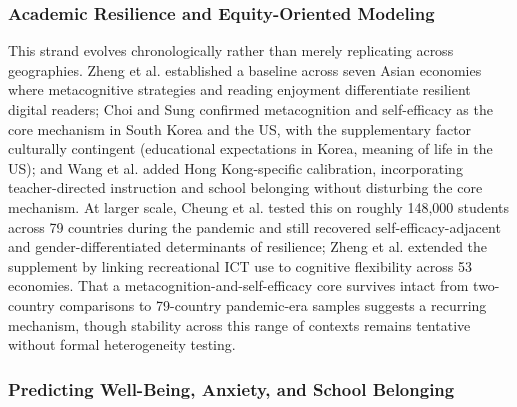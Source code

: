 \documentclass{ieeeaccess}
\begin{document}
\subsubsection{Academic Resilience and Equity-Oriented Modeling}\label{subsubsec4.3.1}

This strand evolves chronologically rather than merely replicating across geographies. Zheng et al. \cite{zheng-etal2023} established a baseline across seven Asian economies where metacognitive strategies and reading enjoyment differentiate resilient digital readers; Choi and Sung \cite{choi-sung2024} confirmed metacognition and self-efficacy as the core mechanism in South Korea and the US, with the supplementary factor culturally contingent (educational expectations in Korea, meaning of life in the US); and Wang et al. \cite{wang-king-leung2022} added Hong Kong-specific calibration, incorporating teacher-directed instruction and school belonging without disturbing the core mechanism. At larger scale, Cheung et al. \cite{cheung-etal2024} tested this on roughly 148,000 students across 79 countries during the pandemic and still recovered self-efficacy-adjacent and gender-differentiated determinants of resilience; Zheng et al. \cite{zheng-cheung-sit-lam2025} extended the supplement by linking recreational ICT use to cognitive flexibility across 53 economies. That a metacognition-and-self-efficacy core survives intact from two-country comparisons to 79-country pandemic-era samples suggests a recurring mechanism, though stability across this range of contexts remains tentative without formal heterogeneity testing.

\subsubsection{Predicting Well-Being, Anxiety, and School Belonging}\label{subsubsec4.3.2}
\end{document}
